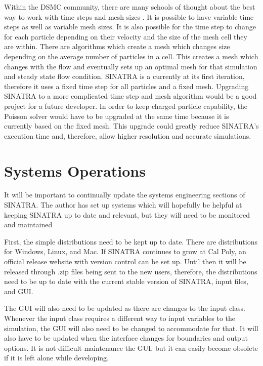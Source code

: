 \indent Within the DSMC community, there are many schools of thought about the best way to work with time steps and mesh sizes \cite{bird_dsmc}. It is possible to have variable time steps as well as variable mesh sizes. It is also possible for the time step to change for each particle depending on their velocity and the size of the mesh cell they are within. There are algorithms which create a mesh which changes size depending on the average number of particles in a cell. This creates a mesh which changes with the flow and eventually sets up an optimal mesh for that simulation and steady state flow condition. SINATRA is a currently at its first iteration, therefore it uses a fixed time step for all particles and a fixed mesh. Upgrading SINATRA to a more complicated time step and mesh algorithm would be a good project for a future developer. In order to keep charged particle capability, the Poisson solver would have to be upgraded at the same time because it is currently based on the fixed mesh. This upgrade could greatly reduce SINATRA’s execution time and, therefore, allow higher resolution and accurate simulations. \par

\section{Systems Operations}

It will be important to continually update the systems engineering sections of SINATRA. The author has set up systems which will hopefully be helpful at keeping SINATRA up to date and relevant, but they will need to be monitored and maintained
 \par

\indent First, the simple distributions need to be kept up to date. There are distributions for Windows, Linux, and Mac. If SINATRA continues to grow at Cal Poly, an official release website with version control can be set up. Until then it will be released through .zip files being sent to the new users, therefore, the distributions need to be up to date with the current stable version of SINATRA, input files, and GUI. \par

\indent The GUI will also need to be updated as there are changes to the input class. Whenever the input class requires a different way to input variables to the simulation, the GUI will also need to be changed to accommodate for that. It will also have to be updated when the interface changes for boundaries and output options. It is not difficult maintenance the GUI, but it can easily become obsolete if it is left alone while developing. \par

